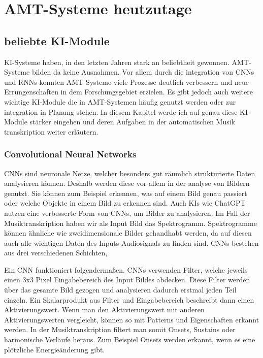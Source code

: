 \section{AMT-Systeme heutzutage}

\subsection{beliebte KI-Module}
\label{subsec:ki_integration}
KI-Systeme haben, in den letzten Jahren stark an beliebtheit gewonnen.
AMT-Systeme bilden da keine Ausnahmen.
Vor allem durch die integration von CNNs und RNNs konnten AMT-Systeme viele Prozesse deutlich verbessern
und neue Errungenschaften in dem Forschungsgebiet erzielen.
Es gibt jedoch auch weitere wichtige KI-Module die in AMT-Systemen häufig genutzt werden
oder zur integration in Planung stehen.
In diesem Kapitel werde ich auf genau diese KI-Module stärker eingehen
und deren Aufgaben in der automatischen Musik transkription weiter erläutern.

\subsubsection{Convolutional Neural Networks}
CNNs sind neuronale Netze, welcher besonders gut räumlich strukturierte Daten analysieren können.
Deshalb werden diese vor allem in der analyse von Bildern genutzt.
Sie können zum Beispiel erkennen, was auf einem Bild genau passiert oder welche Objekte in einem Bild zu erkennen sind.
Auch KIs wie ChatGPT nutzen eine verbesserte Form von CNNs, um Bilder zu analysieren.
Im Fall der Musiktranskription haben wir als Input Bild das Spektrogramm.
Spektrogramme können ähnliche wie zweidimensionale Bilder gehandhabt werden,
da auf diesen auch alle wichtigen Daten des Inputs Audiosignals zu finden sind.
CNNs bestehen aus drei verschiedenen Schichten, %

Ein CNN funktioniert folgendermaßen.
CNNs verwenden Filter, welche jeweils einen 3x3 Pixel Eingabebereich des Input Bildes abdecken.
Diese Filter werden über das gesamte Bild gezogen und analysieren dadurch erstmal jeden Teil einzeln.
Ein Skalarprodukt aus Filter und Eingabebereich beschreibt dann einen Aktivierungswert.
Wenn man den Aktivierungswert mit anderen Aktivierungswerten vergleicht,
können so mit Patterns und Eigenschaften erkannt werden.
In der Musiktranskription filtert man somit Onsets, Sustains oder harmonische Verläufe heraus.
Zum Beispiel Onsets werden erkannt, wenn es eine plötzliche Energieänderung gibt.


